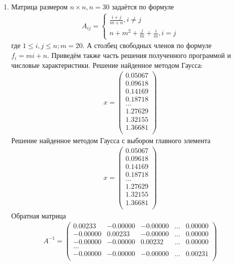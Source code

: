 \documentclass[a4paper,12pt,titlepage,finall]{article}
\begin{document}
\begin{enumerate}
\item
Матрица размером $n \times n, n = 30$ задаётся по формуле
\begin{align}
A_{ij} = \left\{
\begin{array}{ll}
\frac{i+j}{m+n}, i \neq j\\
n + m^2 + \frac{j}{m} + \frac{i}{m}, i = j
\end{array}
\right.
\end{align}
где $1 \leq i,j \leq n; m = 20$. А столбец свободных членов по формуле $f_i = mi + n$. Приведём также часть решения полученного программой и числовые характеристики.
Решение найденное методом Гаусса:
\begin{align*}
x = \begin{pmatrix}
0.05067 \\
   0.09618 \\
   0.14169 \\
   0.18718 \\
   ...\\
   1.27629 \\
   1.32155 \\
   1.36681 \\
\end{pmatrix}
\end{align*}
Решение найденное методом Гаусса с выбором главного элемента
\begin{align*}
x = \begin{pmatrix}
  0.05067 \\
   0.09618 \\
   0.14169 \\
   0.18718 \\
   ...\\
   1.27629 \\
   1.32155 \\
   1.36681 \\
\end{pmatrix}
\end{align*}
Обратная матрица
\begin{align*}
A^{-1} = \begin{pmatrix}
    0.00233&    -0.00000&    -0.00000& ... &0.00000\\
   -0.00000&     0.00233&    -0.00000& ... &0.00000\\
   -0.00000&    -0.00000&     0.00232& ... &0.00000\\
   ...\\
   -0.00000&    -0.00000&    -0.00000& ... &0.00231\\
\end{pmatrix}

\end{align*}
\end{enumerate}
\end{document}
